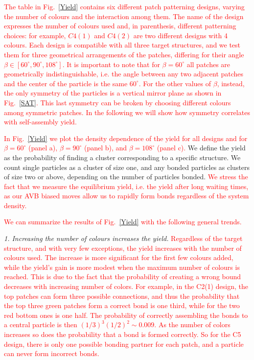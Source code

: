 \documentclass[a4paper, amsfonts, amssymb, amsmath, reprint, showkeys, nofootinbib, twoside]{revtex4-1}
\begin{document}
\textcolor{red}{The table in Fig.~\ref{Yield} contains six different patch patterning designs, varying the number of colours and the interaction among them. The name of the design expresses the number of colours used and, in parenthesis, different patterning choices: for example, $C4(1)$ and $C4(2)$ are two different designs with 4 colours. Each design is compatible with all three target structures, and we test them for three geometrical arrangements of the patches, differing for their angle $\beta\in [60^\circ, 90^\circ, 108^\circ]$. It is important to note that for $\beta=60^\circ$ all patches are geometrically indistinguishable, i.e. the angle between any two adjacent patches and the center of the particle is the same $60^\circ$. For the other values of $\beta$, instead, the only symmetry of the particles is a vertical mirror plane as shown in Fig.~\ref{SAT}. This last symmetry can be broken by choosing different colours among symmetric patches. In the following we will show how symmetry correlates with self-assembly yield.
}

\textcolor{red}{In Fig.~\ref{Yield} we plot the density dependence of the yield for all designs and for $\beta=60^\circ$ (panel a), $\beta=90^\circ$ (panel b), and $\beta=108^\circ$ (panel c).}
We define the yield as the probability of finding a cluster corresponding to a specific structure. We count single particles as a cluster of size one, and any bonded particles as clusters of size two or above, depending on the number of particles bonded.
\textcolor{red}{We stress the fact that we measure the equilibrium yield, i.e. the yield after long waiting times, as our AVB biased moves allow us to rapidly form bonds regardless of the system density.}

\textcolor{red}{We can summarize the results of Fig.~\ref{Yield} with the following general trends.}


\noindent
\emph{1. Increasing the number of colours increases the yield.} \textcolor{red}{Regardless of the target structure, and with very few exceptions, the yield increases with the number of colours used. The increase is more significant for the first few colours added, while the yield's gain is more modest when the maximum number of colours is reached.
This is due to the fact that the probability of creating a wrong bound decreases with increasing number of colors. For example, in the C2(1) design, the top patches can form three possible connections, and thus the probability that the top three green patches form a correct bond is one third, while for the two red bottom ones is one half. The probability of correctly assembling the bonds to a central particle is then $(1/3)^3 (1/2)^2\sim 0.009$. As the number of colors increases so does the probability that a bond is formed correctly. So for the C5 design, there is only one possible bonding partner for each patch, and a particle can never form incorrect bonds.}
\end{document}
